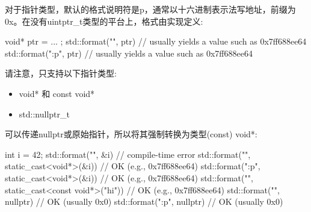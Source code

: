 对于指针类型，默认的格式说明符是p，通常以十六进制表示法写地址，前缀为0x。在没有uintptr\_t类型的平台上，格式由实现定义:

\begin{cpp}
void* ptr = ... ;
std::format("{}", ptr) // usually yields a value such as 0x7ff688ee64
std::format("{:p}", ptr) // usually yields a value such as 0x7ff688ee64
\end{cpp}

请注意，只支持以下指针类型:

\begin{itemize}
\item 
void* 和 const void*

\item 
std::nullptr\_t
\end{itemize}

可以传递nullptr或原始指针，所以将其强制转换为类型(const) void*:

\begin{cpp}
int i = 42;
std::format("{}", &i) // compile-time error
std::format("{}", static_cast<void*>(&i)) // OK (e.g., 0x7ff688ee64)
std::format("{:p}", static_cast<void*>(&i)) // OK (e.g., 0x7ff688ee64)
std::format("{}", static_cast<const void*>("hi")) // OK (e.g., 0x7ff688ee64)
std::format("{}", nullptr) // OK (usually 0x0)
std::format("{:p}", nullptr) // OK (usually 0x0)
\end{cpp}
